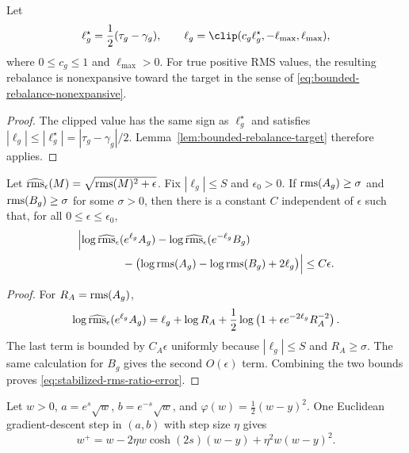 \begin{corollary}
\label{cor:clipped-scheduled-rebalance}
Let
\begin{equation}
    \ell_g^\star=\frac{1}{2}(\tau_g-\gamma_g),
    \qquad
    \ell_g=\clip(c_g\ell_g^\star,-\ell_{\max},\ell_{\max}),
\end{equation}
where $0\leq c_g\leq1$ and $\ell_{\max}>0$.  For true positive RMS values, the resulting
rebalance is nonexpansive toward the target in the sense of
\eqref{eq:bounded-rebalance-nonexpansive}.
\end{corollary}

\begin{proof}
The clipped value has the same sign as $\ell_g^\star$ and satisfies
$|\ell_g|\leq |\ell_g^\star|=|\tau_g-\gamma_g|/2$.  Lemma~\ref{lem:bounded-rebalance-target}
therefore applies.
\end{proof}

\begin{proposition}
\label{prop:stabilized-rms-ratio-error}
Let $\widehat{\operatorname{rms}}_\epsilon(M)=\sqrt{\operatorname{rms}(M)^2+\epsilon}$.  Fix $|\ell_g|\leq S$ and
$\epsilon_0>0$.  If $\operatorname{rms}(A_g)\geq\sigma$ and $\operatorname{rms}(B_g)\geq\sigma$ for some
$\sigma>0$, then there is a constant $C$ independent of $\epsilon$ such that, for all
$0\leq\epsilon\leq\epsilon_0$,
\begin{align}
&\Bigl|\log\widehat{\operatorname{rms}}_\epsilon(e^{\ell_g}A_g)
      -\log\widehat{\operatorname{rms}}_\epsilon(e^{-\ell_g}B_g) \\
&\qquad\qquad
      -\bigl(\log\operatorname{rms}(A_g)-\log\operatorname{rms}(B_g)+2\ell_g\bigr)\Bigr|
\leq C\epsilon .
\label{eq:stabilized-rms-ratio-error}
\end{align}
\end{proposition}

\begin{proof}
For $R_A=\operatorname{rms}(A_g)$,
\begin{equation}
    \log\widehat{\operatorname{rms}}_\epsilon(e^{\ell_g}A_g)
    =\ell_g+\log R_A+\frac{1}{2}\log\left(1+\epsilon e^{-2\ell_g}R_A^{-2}\right).
\end{equation}
The last term is bounded by $C_A\epsilon$ uniformly because $|\ell_g|\leq S$ and
$R_A\geq\sigma$.  The same calculation for $B_g$ gives the second $O(\epsilon)$ term.
Combining the two bounds proves \eqref{eq:stabilized-rms-ratio-error}.
\end{proof}

\begin{lemma}
\label{lem:gauge-dependent-step}
Let $w>0$, $a=e^s\sqrt{w}$, $b=e^{-s}\sqrt{w}$, and
$\varphi(w)=\frac{1}{2}(w-y)^2$.  One Euclidean gradient-descent step in $(a,b)$ with step
size $\eta$ gives
\begin{equation}
    w^+=w-2\eta w\cosh(2s)(w-y)+\eta^2w(w-y)^2.
    \label{eq:scalar-gauge-step}
\end{equation}
\end{lemma}

